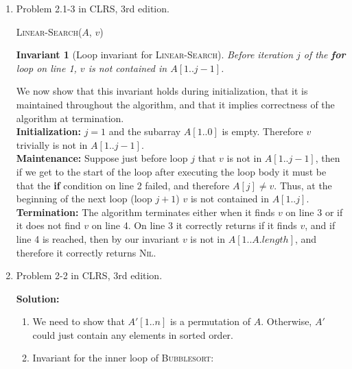 \documentclass[letterpaper,11pt]{article}
\newtheorem{invariant}{Invariant}
\begin{document}
\begin{enumerate}
\item Problem 2.1-3 in CLRS, 3rd edition.

\begin{algorithm}[!h]
\textsc{Linear-Search}($A$, $v$)
\begin{algorithmic}[1]
\State {}
\EndIf
\EndFor
\State {}
\end{algorithmic}
\label{algorithm:linear-search}
\end{algorithm}

\begin{invariant}[Loop invariant for \textsc{Linear-Search}]
Before iteration $j$ of the \textbf{for} loop on line 1, $v$ is not contained in $A[1..j-1]$.
\end{invariant}

We now show that this invariant holds during initialization, that it is maintained throughout the algorithm, and that it implies correctness of the algorithm at termination.\\

\noindent\textbf{Initialization:} $j = 1$ and the subarray $A[1..0]$ is empty. Therefore $v$ trivially is not in $A[1..j-1]$.\\

\noindent\textbf{Maintenance:} Suppose just before loop $j$ that $v$ is not in $A[1..j-1]$, then if we get to the start of the loop after executing the loop body it must be that the \textbf{if} condition on line 2 failed, and therefore $A[j] \neq v$. Thus, at the beginning of the next loop (loop $j+1$) $v$ is not contained in $A[1..j]$. \\

\noindent\textbf{Termination:} The algorithm terminates either when it finds $v$ on line 3 or if it does not find $v$ on line 4. On line 3 it correctly returns if it finds $v$, and if line 4 is reached, then by our invariant $v$ is not in $A[1..A.length]$, and therefore it correctly returns \textsc{Nil}.

\newpage

\item Problem 2-2 in CLRS, 3rd edition.

\noindent\textbf{Solution:}

\begin{enumerate}
\item We need to show that $A'[1..n]$ is a permutation of $A$. Otherwise, $A'$ could just contain any elements in sorted order.
\item Invariant for the inner loop of \textsc{Bubblesort}:


\end{enumerate}
\end{enumerate}
\end{document}
